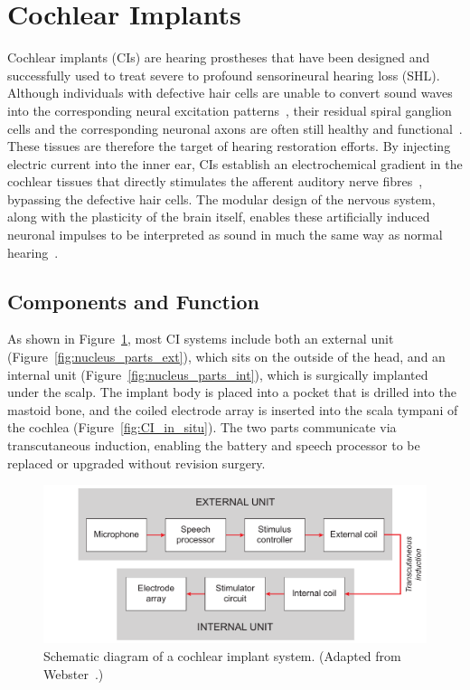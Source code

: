 \section{Cochlear Implants}
\label{sect:cochlear_implants}

Cochlear implants (CIs) are hearing prostheses that have been designed and
successfully used to treat severe to profound sensorineural hearing loss (SHL).
Although individuals with defective hair cells are unable to convert sound waves
into the corresponding neural excitation patterns~\cite{clark1996}, their
residual spiral ganglion cells and the corresponding neuronal axons are often
still healthy and functional~\cite{pfingst2011}. These tissues are therefore the
target of hearing restoration efforts. By injecting electric current into the
inner ear, CIs establish an electrochemical gradient in the cochlear tissues
that directly stimulates the afferent auditory nerve
fibres~\cite{nadol1988treatment,brown2001}, bypassing the defective hair cells.
The modular design of the nervous system, along with the plasticity of the brain
itself, enables these artificially induced neuronal impulses to be interpreted
as sound in much the same way as normal hearing~\cite{fallon2008}.

\subsection{Components and Function}

As shown in Figure~\ref{fig:CI_schematic}, most CI systems include both an
external unit (Figure~\ref{fig:nucleus_parts_ext}), which sits on the outside of
the head, and an internal unit (Figure~\ref{fig:nucleus_parts_int}), which is
surgically implanted under the scalp. The implant body is placed into a pocket
that is drilled into the mastoid bone, and the coiled electrode array is
inserted into the scala tympani of the cochlea (Figure~\ref{fig:CI_in_situ}).
The two parts communicate via transcutaneous induction, enabling the battery and
speech processor to be replaced or upgraded without revision surgery.

\begin{figure}[p]
	\centering
	\includegraphics[width=14.5cm]{Background/implant_schematic.pdf}
	\caption[Schematic diagram of a cochlear implant system]{Schematic diagram of a
	cochlear implant system. (Adapted from Webster~\cite{webster1998}.)}
	\label{fig:CI_schematic}
\end{figure}

